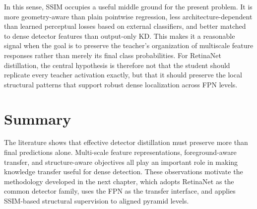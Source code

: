 In this sense, SSIM occupies a useful middle ground for the present problem. It is more geometry-aware than plain pointwise regression, less architecture-dependent than learned perceptual losses based on external classifiers, and better matched to dense detector features than output-only KD. This makes it a reasonable signal when the goal is to preserve the teacher's organization of multiscale feature responses rather than merely its final class probabilities. For RetinaNet distillation, the central hypothesis is therefore not that the student should replicate every teacher activation exactly, but that it should preserve the local structural patterns that support robust dense localization across FPN levels.

\section{Summary}

The literature shows that effective detector distillation must preserve more than final predictions alone. Multi-scale feature representations, foreground-aware transfer, and structure-aware objectives all play an important role in making knowledge transfer useful for dense detection. These observations motivate the methodology developed in the next chapter, which adopts RetinaNet as the common detector family, uses the FPN as the transfer interface, and applies SSIM-based structural supervision to aligned pyramid levels.
